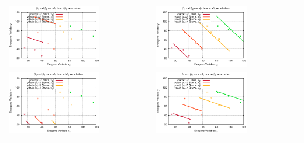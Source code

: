 \documentclass[a4paper]{foils}
\begin{document}
\begin{landscape}
\begin{center}
\begin{tabular}{ll}
\includegraphics[width=0.65\textwidth]{figsRegr/hotel_scatterplot_x2ycondx1_notCal1.eps}
&
\includegraphics[width=0.65\textwidth]{figsRegr/hotel_scatterplot_x2ycondx1_notCal2.eps}
\\
\includegraphics[width=0.65\textwidth]{figsRegr/hotel_scatterplot_x2ycondx1_notCal3.eps}
&
\includegraphics[width=0.65\textwidth]{figsRegr/hotel_scatterplot_x2ycondx1_notCal4.eps}
\end{tabular}


\end{center}
\end{landscape}
\end{document}
